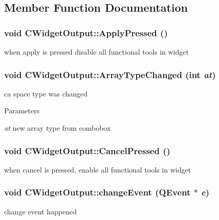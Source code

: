\subsection{Member Function Documentation}
\hypertarget{classCWidgetOutput_a85f2e81ad45e331d0a37d5d7e11a4b53}{
\subsubsection[{ApplyPressed}]{\setlength{\rightskip}{0pt plus 5cm}void CWidgetOutput::ApplyPressed ()}}
\label{classCWidgetOutput_a85f2e81ad45e331d0a37d5d7e11a4b53}
when apply is pressed disable all functional tools in widget \hypertarget{classCWidgetOutput_ab16e835c4cfa86cc10db87d3d7a4049b}{
\subsubsection[{ArrayTypeChanged}]{\setlength{\rightskip}{0pt plus 5cm}void CWidgetOutput::ArrayTypeChanged (int {\em at})}}
\label{classCWidgetOutput_ab16e835c4cfa86cc10db87d3d7a4049b}
ca space type was changed


\begin{DoxyParams}{Parameters}
\item[{\em at}]new array type from combobox \end{DoxyParams}
\hypertarget{classCWidgetOutput_a8d34da834418a33f61ad02a7559ab6e4}{
\subsubsection[{CancelPressed}]{\setlength{\rightskip}{0pt plus 5cm}void CWidgetOutput::CancelPressed ()}}
\label{classCWidgetOutput_a8d34da834418a33f61ad02a7559ab6e4}
when cancel is pressed, enable all functional tools in widget \hypertarget{classCWidgetOutput_adc2fe6c29b5efecb84cbd9a2c854a8ae}{
\subsubsection[{changeEvent}]{\setlength{\rightskip}{0pt plus 5cm}void CWidgetOutput::changeEvent (QEvent $\ast$ {\em e})}}
\label{classCWidgetOutput_adc2fe6c29b5efecb84cbd9a2c854a8ae}
change event happened


